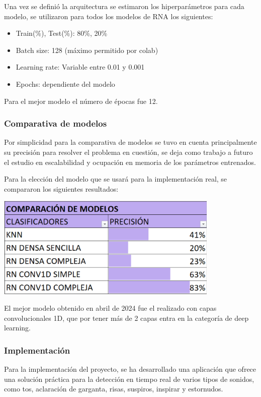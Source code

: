 Una vez se definió la arquitectura se estimaron los hiperparámetros para cada modelo, se utilizaron para todos los modelos de RNA los siguientes:
\begin{itemize}
    \item Train(\%), Test(\%): 80\%, 20\%
    \item Batch size: 128 (máximo permitido por colab)
    \item Learning rate: Variable entre 0.01 y 0.001
    \item Epochs: dependiente del modelo
\end{itemize}
Para el mejor modelo el número de épocas fue 12.
\subsubsection{Comparativa de modelos}
Por simplicidad para la comparativa de modelos se tuvo en cuenta principalmente su precisión para resolver el problema en cuestión, se deja como trabajo a futuro el estudio en escalabilidad y ocupación en memoria de los parámetros entrenados.

Para la elección del modelo que se usará para la implementación real, se compararon los siguientes resultados:
\begin{center}
    \includegraphics[width=0.8\textwidth]{ImagenesLatex/ComparacionModelos.PNG}
\end{center}

El mejor modelo obtenido en abril de 2024 fue el realizado con capas convolucionales 1D, que por tener más de 2 capas entra en la categoría de deep learning.

\subsubsection{Implementación}
Para la implementación del proyecto, se ha desarrollado una aplicación que ofrece una solución práctica para la detección en tiempo real de varios tipos de sonidos, como tos, aclaración de garganta, risas, suspiros, inspirar y estornudos.


